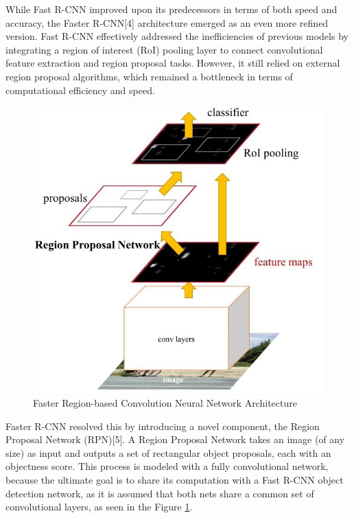 While Fast R-CNN improved upon its predecessors in terms of both speed and accuracy, the Faster R-CNN[4] architecture emerged as an even more refined version. 
Fast R-CNN effectively addressed the inefficiencies of previous models by integrating a region of interest (RoI) pooling layer to connect convolutional 
feature extraction and region proposal tasks. However, it still relied on external region proposal algorithms, which remained a bottleneck in terms of 
computational efficiency and speed. 

\begin{figure}[h!]
    \centering
    \includegraphics[scale=0.4]{Figures/faster-rcnn.jpeg}
    \caption{Faster Region-based Convolution Neural Network Architecture}
    \label{fig:faster-rcnn}
\end{figure}

Faster R-CNN resolved this by introducing a novel component, the Region Proposal Network (RPN)[5]. A Region Proposal Network takes an image
(of any size) as input and outputs a set of rectangular object proposals, each with an objectness score. This process is modeled with a fully 
convolutional network, because the ultimate goal is to share its computation with a Fast R-CNN object detection network, as it is assumed that 
both nets share a common set of convolutional layers, as seen in the Figure \ref{fig:faster-rcnn}.



